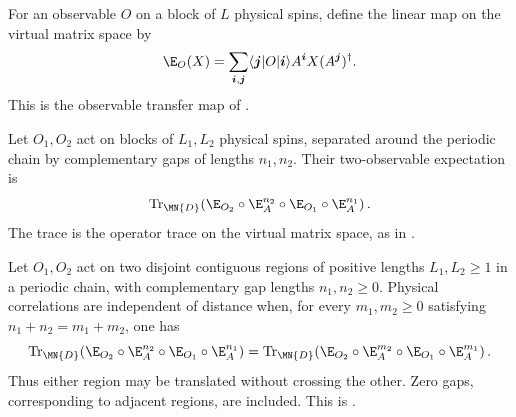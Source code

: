 \begin{definition}
    \label{def:physical_observable_transfer}
    \leanok
    For an observable $O$ on a block of $L$ physical spins, define the linear
    map on the virtual matrix space by
    \[
        \E_O(X)=\sum_{\boldsymbol i,\boldsymbol j}
        \langle\boldsymbol j|O|\boldsymbol i\rangle
        A^{\boldsymbol i}X(A^{\boldsymbol j})^\dagger .
    \]
    This is the observable transfer map of
    \cite[lines~490--496]{Cirac2016MPDO_arXiv}.
\end{definition}

\begin{definition}
    \label{def:physical_two_point_expectation}
    \leanok
    Let $O_1,O_2$ act on blocks of $L_1,L_2$ physical spins, separated around
    the periodic chain by complementary gaps of lengths $n_1,n_2$.  Their
    two-observable expectation is
    \[
        \operatorname{Tr}_{\MN{D}}\!\left(
        \E_{O_2}\circ\E_A^{n_2}\circ\E_{O_1}\circ\E_A^{n_1}
        \right).
    \]
    The trace is the operator trace on the virtual matrix space, as in
    \cite[lines~490--496]{Cirac2016MPDO_arXiv}.
\end{definition}

\begin{definition}%
    \label{def:source_physical_cid}
    \leanok
    Let $O_1,O_2$ act on two disjoint contiguous regions of positive lengths
    $L_1,L_2\geq1$ in a periodic chain, with complementary gap lengths
    $n_1,n_2\geq0$. Physical correlations are independent of distance when, for
    every $m_1,m_2\geq0$ satisfying
    $n_1+n_2=m_1+m_2$, one has
    \[
      \operatorname{Tr}_{\MN{D}}\!\left(
        \E_{O_2}\circ\E_A^{n_2}\circ\E_{O_1}\circ\E_A^{n_1}\right)
      =
      \operatorname{Tr}_{\MN{D}}\!\left(
        \E_{O_2}\circ\E_A^{m_2}\circ\E_{O_1}\circ\E_A^{m_1}\right).
    \]
    Thus either region may be translated without crossing the other. Zero
    gaps, corresponding to adjacent regions, are included. This is
    \cite[Definition~3.3 and lines~490--496]{Cirac2016MPDO_arXiv}.
\end{definition}

